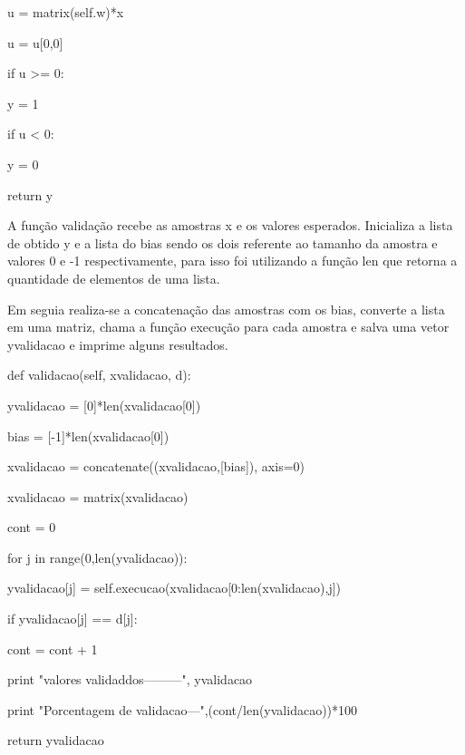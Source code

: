\documentclass[
12pt, 
a4paper,
oneside,			%
english,			%
french,				%
spanish,			%
brazil,	
]{abntex2}
\begin{document}
		 u = matrix(self.w)*x\
		
		 u = u[0,0]
		           
		 if u >= 0:
		
		\hspace{0,5cm}y = 1
		
		if u < 0:
		
		\hspace{0,5cm}y = 0
		
	     return y\\
	     
	     \setlength{\parindent}{1,0 cm}
	
	A função validação recebe as amostras x e os valores esperados. Inicializa a lista de obtido y e a lista do bias sendo os dois  referente ao tamanho da amostra e valores 0 e -1 respectivamente, para isso foi utilizando a função len que retorna a quantidade de elementos de uma lista. 
	
	Em seguia realiza-se a concatenação das amostras com os bias, converte a lista em uma matriz, chama a função execução para cada amostra e salva uma vetor yvalidacao e imprime alguns resultados.
	
	def validacao(self, xvalidacao, d): 
	
	\setlength{\parindent}{1,5 cm}
	  
	yvalidacao = [0]*len(xvalidacao[0])
	
	bias = [-1]*len(xvalidacao[0])
	
	xvalidacao = concatenate((xvalidacao,[bias]), axis=0) 
	     
	xvalidacao = matrix(xvalidacao)
	
	cont = 0 
		
	for j in range(0,len(yvalidacao)): 
		
		\hspace{0,5cm}yvalidacao[j] = self.execucao(xvalidacao[0:len(xvalidacao),j])
		
		\hspace{0,5cm}if yvalidacao[j] == d[j]:
		
		\hspace{1,0cm}cont = cont + 1   
		  
	    print "valores validaddos---------", yvalidacao 
		
	    print "Porcentagem de validacao---",(cont/len(yvalidacao))*100 
		 
	    return yvalidacao\\
	    
	    \setlength{\parindent}{1.0 cm}
\end{document}
